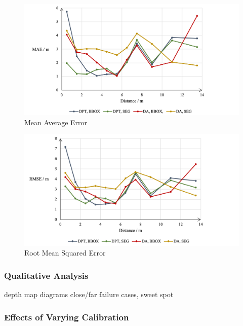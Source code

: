 \begin{figure}[H]
    \centering
    \includegraphics[width=1.01\textwidth]{body/analysis/assets/errors/MAE}
    \caption{Mean Average Error}
    \label{fig:mae}
\end{figure}

\begin{figure}[H]
    \centering
    \includegraphics[width=1.01\textwidth]{body/analysis/assets/errors/RMSE}
    \caption{Root Mean Squared Error}
    \label{fig:rmse}
\end{figure}

\clearpage


\subsubsection{Qualitative Analysis}
depth map diagrams
close/far failure cases, sweet spot

\subsubsection{Effects of Varying Calibration}